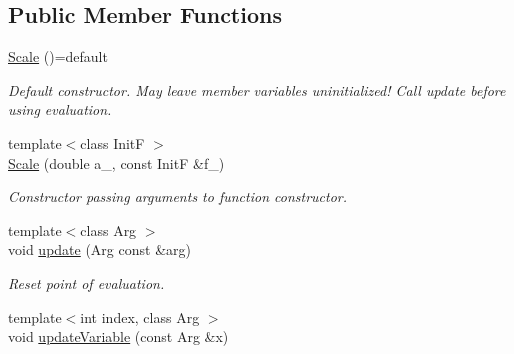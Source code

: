 \subsection*{Public Member Functions}
\begin{DoxyCompactItemize}
\item 
\hypertarget{structRFFGen_1_1MathematicalOperations_1_1Scale_af8fabe28c4a3bfbb5468ceccc1efbec2}{\hyperlink{structRFFGen_1_1MathematicalOperations_1_1Scale_af8fabe28c4a3bfbb5468ceccc1efbec2}{Scale} ()=default}\label{structRFFGen_1_1MathematicalOperations_1_1Scale_af8fabe28c4a3bfbb5468ceccc1efbec2}

\begin{DoxyCompactList}\small\item\em Default constructor. May leave member variables uninitialized! Call update before using evaluation. \end{DoxyCompactList}\item 
{\footnotesize template$<$class Init\-F $>$ }\\\hyperlink{structRFFGen_1_1MathematicalOperations_1_1Scale_a93e5aa65f4fa7f496691e259dbc06c98}{Scale} (double a\-\_\-, const Init\-F \&f\-\_\-)
\begin{DoxyCompactList}\small\item\em Constructor passing arguments to function constructor. \end{DoxyCompactList}\item 
\hypertarget{structRFFGen_1_1MathematicalOperations_1_1Scale_aca94d08d0113284e8d70f6bca9638952}{{\footnotesize template$<$class Arg $>$ }\\void \hyperlink{structRFFGen_1_1MathematicalOperations_1_1Scale_aca94d08d0113284e8d70f6bca9638952}{update} (Arg const \&arg)}\label{structRFFGen_1_1MathematicalOperations_1_1Scale_aca94d08d0113284e8d70f6bca9638952}

\begin{DoxyCompactList}\small\item\em Reset point of evaluation. \end{DoxyCompactList}\item 
\hypertarget{structRFFGen_1_1MathematicalOperations_1_1Scale_ad90664cd65d9f0f4911a47836d21a31b}{{\footnotesize template$<$int index, class Arg $>$ }\\void \hyperlink{structRFFGen_1_1MathematicalOperations_1_1Scale_ad90664cd65d9f0f4911a47836d21a31b}{update\-Variable} (const Arg \&x)}\label{structRFFGen_1_1MathematicalOperations_1_1Scale_ad90664cd65d9f0f4911a47836d21a31b}


\end{DoxyCompactItemize}
